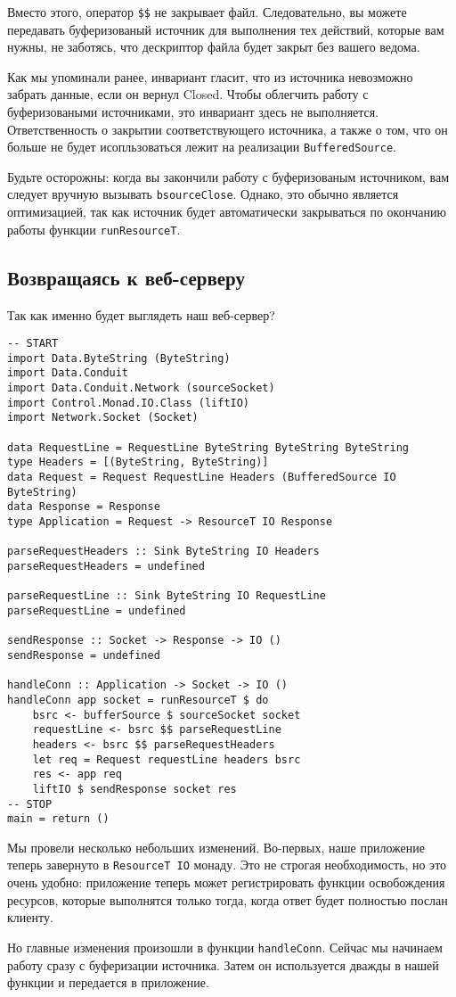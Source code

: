 Вместо этого, оператор \verb#$$# не закрывает файл. Следовательно, вы можете 
передавать буферизованый источник для выполнения тех действий, которые вам 
нужны, не заботясь, что дескриптор файла будет закрыт без вашего ведома.
\begin{remark}
Как мы упоминали ранее, инвариант гласит, что из источника невозможно забрать 
данные, если он вернул Closed. Чтобы облегчить работу с буферизоваными 
источниками, это инвариант здесь не выполняется. Ответственность о закрытии 
соответствующего источника, а также о том, что он больше не будет исопльзоваться
лежит на реализации \lstinline'BufferedSource'.
\end{remark}
Будьте осторожны: когда вы закончили работу с буферизованым источником, вам 
следует вручную вызывать \lstinline'bsourceClose'. Однако, это обычно является 
оптимизацией, так как источник будет автоматически закрываться по окончанию 
работы функции \lstinline'runResourceT'.

\subsection{Возвращаясь к веб-серверу}
Так как именно будет выглядеть наш веб-сервер?
\begin{lstlisting}
-- START
import Data.ByteString (ByteString)
import Data.Conduit
import Data.Conduit.Network (sourceSocket)
import Control.Monad.IO.Class (liftIO)
import Network.Socket (Socket)

data RequestLine = RequestLine ByteString ByteString ByteString
type Headers = [(ByteString, ByteString)]
data Request = Request RequestLine Headers (BufferedSource IO ByteString)
data Response = Response
type Application = Request -> ResourceT IO Response

parseRequestHeaders :: Sink ByteString IO Headers
parseRequestHeaders = undefined

parseRequestLine :: Sink ByteString IO RequestLine
parseRequestLine = undefined

sendResponse :: Socket -> Response -> IO ()
sendResponse = undefined

handleConn :: Application -> Socket -> IO ()
handleConn app socket = runResourceT $ do
    bsrc <- bufferSource $ sourceSocket socket
    requestLine <- bsrc $$ parseRequestLine
    headers <- bsrc $$ parseRequestHeaders
    let req = Request requestLine headers bsrc
    res <- app req
    liftIO $ sendResponse socket res
-- STOP
main = return ()
\end{lstlisting}
Мы провели несколько небольших изменений. Во-первых, наше приложение теперь завернуто в 
\lstinline=ResourceT IO= монаду. Это не строгая необходимость, но это очень удобно:
приложение теперь может регистрировать функции освобождения ресурсов, которые выполнятся только тогда, когда ответ будет полностью послан клиенту.

Но главные изменения произошли в функции \lstinline=handleConn=. Сейчас мы начинаем работу
сразу с буферизации источника. Затем он используется дважды в нашей функции и передается в
приложение.

